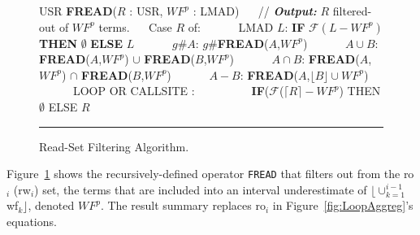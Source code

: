 \documentclass{sig-alternate}
\begin{document}
\begin{figure}[t]
\begin{scriptsize}
USR {\bf FREAD}($R$ : USR, $WF^p$ : LMAD) \vspace{1ex} \newline
$\mbox{ }\mbox{ }$// {\bf {\em Output:}} $R$ filtered-out of $WF^p$ terms. \vspace{1ex} \newline
$\mbox{ }\mbox{ }$Case $R$ of: \vspace{1ex} \newline
$\mbox{ }\mbox{ }\mbox{ }\mbox{ }$ LMAD $L$: %
{\bf IF} $\mathcal{F}(L - WF^p)$ {\bf THEN} $\emptyset$ {\bf ELSE} $L$ \vspace{1ex} \newline
$\mbox{ }\mbox{ }\mbox{ }\mbox{ }$ $g\#A$: $g\#${\bf FREAD}($A$,$WF^p$)  \vspace{1ex} \newline   
$\mbox{ }\mbox{ }\mbox{ }\mbox{ }$ $A \cup B$: {\bf FREAD}($A$,$WF^p$) $\cup$ {\bf FREAD}($B$,$WF^p$) \vspace{1ex} \newline
$\mbox{ }\mbox{ }\mbox{ }\mbox{ }$ $A \cap B$: {\bf FREAD}($A$,$WF^p$) $\cap$ {\bf FREAD}($B$,$WF^p$) \vspace{1ex} \newline
$\mbox{ }\mbox{ }\mbox{ }\mbox{ }$ $A - B$: {\bf FREAD}($A$,$\lfloor B \rfloor \cup WF^p$)   \vspace{1ex} \newline
$\mbox{ }\mbox{ }\mbox{ }\mbox{ }$ LOOP OR CALLSITE :   \vspace{1ex} \newline   
$\mbox{ }\mbox{ }\mbox{ }$ 
$\mbox{ }\mbox{ }\mbox{ }$ 
          {\bf IF}($\mathcal{F}$($\lceil R \rceil - WF^p$) THEN $\emptyset$ ELSE $R$ \vspace{1ex} \newline
\end{scriptsize}
\hrule
\caption{ Read-Set Filtering Algorithm.}
\label{fig:ReadFilt} %
\end{figure}


Figure~\ref{fig:ReadFilt} shows the recursively-defined operator {\tt FREAD} that
filters out from the {\sc ro}$_i$ ({\sc rw}$_i$) set, the terms that are included 
into an interval underestimate of $\lfloor\cup_{k=1}^{i-1}${\sc wf}$_k\rfloor$, 
denoted $WF^p$.
The result summary replaces {\sc ro}$_i$ in Figure~\ref{fig:LoopAggreg}'s equations.
\end{document}
